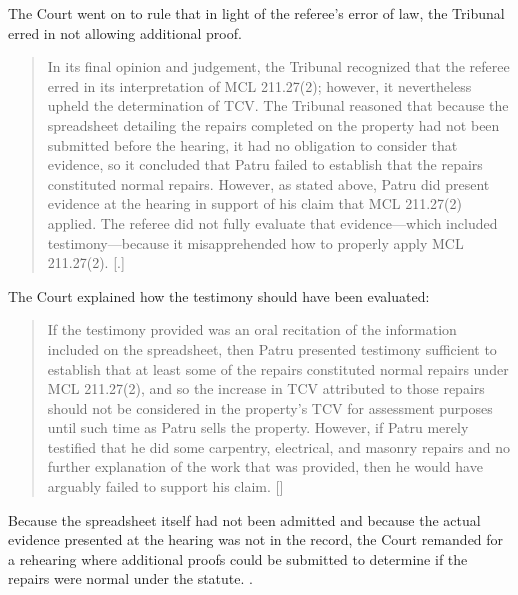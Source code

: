 \documentclass[12pt,\documentclassflag]{michiganCourtOfAppealsBrief}
\begin{document}
The Court went on to rule that in light of the referee's error of law, the Tribunal erred in not allowing additional proof.

\begin{quote} In its final opinion and judgement, the Tribunal recognized that the referee erred in its
interpretation of MCL 211.27(2); however, it nevertheless upheld the determination of TCV.
The Tribunal reasoned that because the spreadsheet detailing the repairs completed on the
property had not been submitted before the hearing, it had no obligation to consider that
evidence, so it concluded that Patru failed to establish that the repairs constituted normal repairs.
However, as stated above, Patru did present evidence at the hearing in support of his claim that
MCL 211.27(2) applied. The referee did not fully evaluate that evidence—which included
testimony—because it misapprehended how to properly apply MCL 211.27(2).
  [.]
\end{quote}

The Court explained how the testimony should have been evaluated:

\begin{quote}If the testimony provided was an oral recitation of the
information included on the spreadsheet, then Patru presented testimony sufficient to establish
that at least some of the repairs constituted normal repairs under MCL 211.27(2), and so the
increase in TCV attributed to those repairs should not be considered in the property’s TCV for
assessment purposes until such time as Patru sells the property. However, if Patru merely
testified that he did some carpentry, electrical, and masonry repairs and no further explanation of
the work that was provided, then he would have arguably failed to support his claim. []
\end{quote}

Because the spreadsheet itself had not been admitted and because the actual evidence presented at the hearing was not in the record, the Court remanded for a rehearing where additional proofs could be submitted to determine if the repairs were normal under the statute. .



\end{document}
